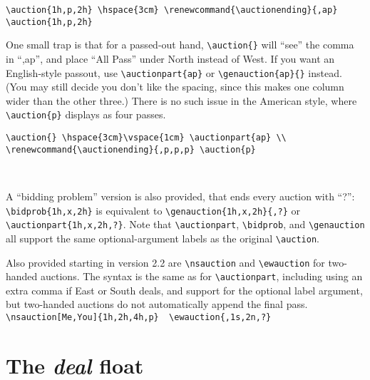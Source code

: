 \documentclass[10pt]{article}%
\newcommand{\gap}{\vspace{\baselineskip}}
\begin{document}
\verb+\auction{1h,p,2h} \hspace{3cm} \renewcommand{\auctionending}{,ap} \auction{1h,p,2h}+

 \hspace{3cm}
\renewcommand{\auctionending}{,ap}

\gap One small trap is that for a passed-out hand, \verb+\auction{}+ will ``see'' the comma in ``,ap'', and place ``All Pass'' under North instead of West. If you want an English-style passout, use \verb+\auctionpart{ap}+ or \verb+\genauction{ap}{}+ instead. (You may still decide you don't like the spacing, since this makes one column wider than the other three.) There is no such issue in the American style, where \verb+\auction{p}+ displays as four passes.

\begin{verbatim}
\auction{} \hspace{3cm}\vspace{1cm} \auctionpart{ap} \\ 
\renewcommand{\auctionending}{,p,p,p} \auction{p} 
\end{verbatim}

\auction{} \hspace{3cm}\vspace{1cm} \\ \renewcommand{\auctionending}{,p,p,p} 

\gap
A ``bidding problem'' version is also provided, that ends every auction with ``?'': \verb+\bidprob{1h,x,2h}+ is equivalent to \verb+\genauction{1h,x,2h}{,?}+ or \verb+\auctionpart{1h,x,2h,?}+. Note that \verb+\auctionpart+, \verb+\bidprob+, and \verb+\genauction+ all support the same optional-argument labels as the original \verb+\auction+.


\gap Also provided starting in version 2.2 are \verb+\nsauction+ and \verb+\ewauction+ for two-handed auctions. The syntax is the same as for \verb+\auctionpart+, including using an extra comma if East or South deals, and support for the optional label argument, but two-handed auctions do not automatically append the final pass.
\verb+ \nsauction[Me,You]{1h,2h,4h,p}  \ewauction{,1s,2n,?}+ 

 \gap{}  



\section{The \textit{deal} float}
\end{document}
